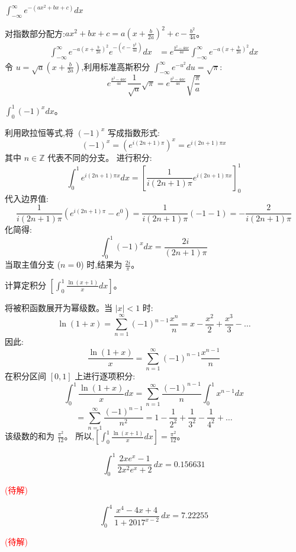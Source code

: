 \begin{questions}
\question $\int_{-\infty}^{\infty} e^{-(ax^2+bx+c)} dx$
\begin{solution}
对指数部分配方:$ax^2 + bx + c = a(x + \frac{b}{2a})^2 + c - \frac{b^2}{4a}$。
\begin{align*}
\int_{-\infty}^{\infty} e^{-a(x+\frac{b}{2a})^2} e^{-(c-\frac{b^2}{4a})} dx &= e^{\frac{b^2-4ac}{4a}} \int_{-\infty}^{\infty} e^{-a(x+\frac{b}{2a})^2} dx
\end{align*}
令 $u = \sqrt{a}(x + \frac{b}{2a})$,利用标准高斯积分 $\int_{-\infty}^{\infty} e^{-u^2} du = \sqrt{\pi}$:
\[ e^{\frac{b^2-4ac}{4a}} \frac{1}{\sqrt{a}} \sqrt{\pi} = e^{\frac{b^2-4ac}{4a}} \sqrt{\frac{\pi}{a}} \]
\end{solution}
\question  $\int_0^1 (-1)^x dx$。
\begin{solution}
利用欧拉恒等式,将 $(-1)^x$ 写成指数形式:
\[ (-1)^x = (e^{i(2n+1)\pi})^x = e^{i(2n+1)\pi x} \]
其中 $n \in \mathbb{Z}$ 代表不同的分支。
进行积分:
\[ \int_0^1 e^{i(2n+1)\pi x} dx = \left[ \frac{1}{i(2n+1)\pi} e^{i(2n+1)\pi x} \right]_0^1 \]
代入边界值:
\[ \frac{1}{i(2n+1)\pi} (e^{i(2n+1)\pi} - e^0) = \frac{1}{i(2n+1)\pi} (-1 - 1) = -\frac{2}{i(2n+1)\pi} \]
化简得:
\[ \int_0^1 (-1)^x dx = \frac{2i}{(2n+1)\pi} \]
当取主值分支 ($n=0$) 时,结果为 $\frac{2i}{\pi}$。
\end{solution}

\question 计算定积分 $[\int_0^1 \frac{\ln(x+1)}{x} dx]$。
\begin{solution}
将被积函数展开为幂级数。当 $|x| < 1$ 时:
\[ \ln(1+x) = \sum_{n=1}^\infty (-1)^{n-1} \frac{x^n}{n} = x - \frac{x^2}{2} + \frac{x^3}{3} - \dots \]
因此:
\[ \frac{\ln(1+x)}{x} = \sum_{n=1}^\infty (-1)^{n-1} \frac{x^{n-1}}{n} \]
在积分区间 $[0, 1]$ 上进行逐项积分:
\[ \int_0^1 \frac{\ln(1+x)}{x} dx = \sum_{n=1}^\infty \frac{(-1)^{n-1}}{n} \int_0^1 x^{n-1} dx \]
\[ = \sum_{n=1}^\infty \frac{(-1)^{n-1}}{n^2} = 1 - \frac{1}{2^2} + \frac{1}{3^2} - \frac{1}{4^2} + \dots \]
该级数的和为 $\frac{\pi^2}{12}$。
所以,$[\int_0^1 \frac{\ln(x+1)}{x} dx] = \frac{\pi^2}{12}$。
\end{solution}
    
    \question 
    \[
    \int_0^1 \frac{2x e^x - 1}{2x^2 e^x + 2} \, dx = 0.156631
    \]
    \begin{solution}
    \textcolor{red}{(待解)}
    \end{solution}     %
    
    \question 
    \[
    \int_0^4 \frac{x^4 - 4x + 4}{1 + 2017^{x - 2}} \, dx = 7.22255
    \]
    \begin{solution}
    \textcolor{red}{(待解)}
    \end{solution}

\end{questions}
\pagebreak

